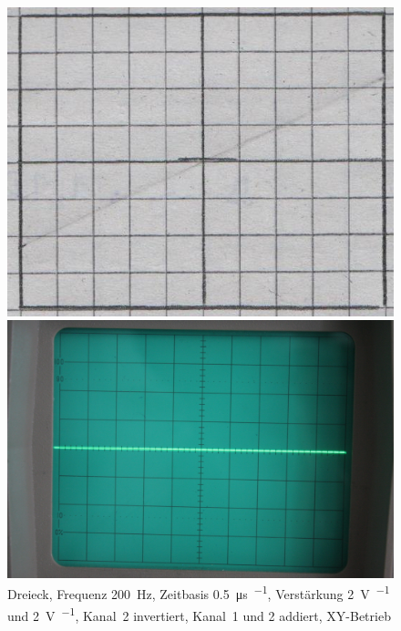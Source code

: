 \begin{figure}[htbp]
	\centering
	\begin{minipage}{.45\linewidth}
	\includegraphics[width=\linewidth]{Oszi_Hand/785.jpg}
	\end{minipage}
	\hfill
	\begin{minipage}{.45\linewidth}
	\includegraphics[width=\linewidth]{Oszi_Foto/785.jpg}
	\end{minipage}
	\caption{%
		Dreieck, Frequenz \SI{200}{\hertz},
		Zeitbasis \SI{.5}{\micro\second\per\division},
		Verstärkung \SI{2}{\volt\per\division} und \SI{2}{\volt\per\division},
		Kanal~2 invertiert, Kanal~1 und 2 addiert, XY-Betrieb
	}
	\label{fig:785}
\end{figure}

